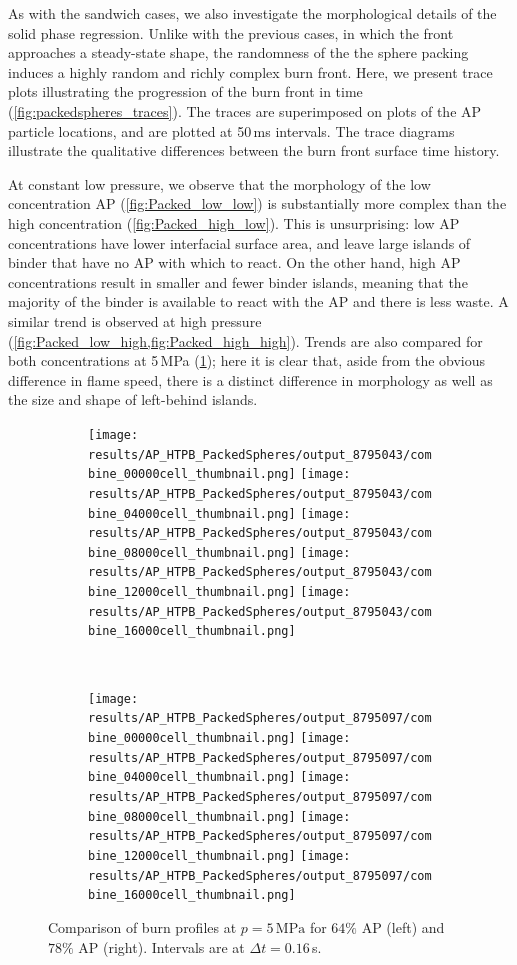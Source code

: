 \documentclass[colorinlistoftodos,review]{elsarticle}
\begin{document}
As with the sandwich cases, we also investigate the morphological details of the solid phase regression.
Unlike with the previous cases, in which the front approaches a steady-state shape, the randomness of the the sphere packing induces a highly random and richly complex burn front. 
Here, we present trace plots illustrating the progression of the burn front in time (\cref{fig:packedspheres_traces}).
The traces are superimposed on plots of the AP particle locations, and are plotted at 50\,ms intervals.
The trace diagrams illustrate the qualitative differences between the burn front surface time history.

At constant low pressure, we observe that the morphology of the low concentration AP (\cref{fig:Packed_low_low}) is substantially more complex than the high concentration (\cref{fig:Packed_high_low}).
This is unsurprising: low AP concentrations have lower interfacial surface area, and leave large islands of binder that have no AP with which to react.
On the other hand, high AP concentrations result in smaller and fewer binder islands, meaning that the majority of the binder is available to react with the AP and there is less waste.
A similar trend is observed at high pressure (\cref{fig:Packed_low_high,fig:Packed_high_high}).
Trends are also compared for both concentrations at 5\,MPa (\cref{fig:packed_single_front_track}); here it is clear that, aside from the obvious difference in flame speed, there is a distinct difference in morphology as well as the size and shape of left-behind islands.



\begin{figure}[t]
  \centering
  \begin{subfigure}{0.8\linewidth}\centering
    \texttt{[image: results/AP\_HTPB\_PackedSpheres/output\_8795043/combine\_00000cell\_thumbnail.png]}%
    \texttt{[image: results/AP\_HTPB\_PackedSpheres/output\_8795043/combine\_04000cell\_thumbnail.png]}%
    \texttt{[image: results/AP\_HTPB\_PackedSpheres/output\_8795043/combine\_08000cell\_thumbnail.png]}%
    \texttt{[image: results/AP\_HTPB\_PackedSpheres/output\_8795043/combine\_12000cell\_thumbnail.png]}%
    \texttt{[image: results/AP\_HTPB\_PackedSpheres/output\_8795043/combine\_16000cell\_thumbnail.png]}
  \end{subfigure}
  \\
  \begin{subfigure}{0.8\linewidth}\centering
    \texttt{[image: results/AP\_HTPB\_PackedSpheres/output\_8795097/combine\_00000cell\_thumbnail.png]}%
    \texttt{[image: results/AP\_HTPB\_PackedSpheres/output\_8795097/combine\_04000cell\_thumbnail.png]}%
    \texttt{[image: results/AP\_HTPB\_PackedSpheres/output\_8795097/combine\_08000cell\_thumbnail.png]}%
    \texttt{[image: results/AP\_HTPB\_PackedSpheres/output\_8795097/combine\_12000cell\_thumbnail.png]}%
    \texttt{[image: results/AP\_HTPB\_PackedSpheres/output\_8795097/combine\_16000cell\_thumbnail.png]}
  \end{subfigure}
  \caption{
    Comparison of burn profiles at $p=5\,\mathrm{MPa}$ for $64\%$ AP (left) and $78\%$ AP (right).
    Intervals are at $\Delta t = 0.16$\,s.
  }
  \label{fig:packed_single_front_track}
\end{figure}
\end{document}
